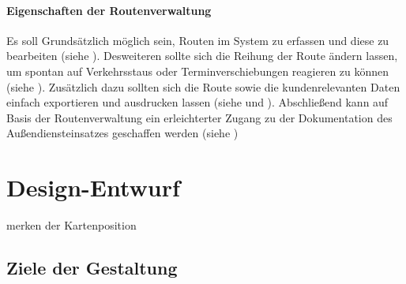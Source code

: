 \documentclass[Bachelorarbeit.tex]{subfiles}
\begin{document}

\paragraph{Eigenschaften der Routenverwaltung}

Es soll Grundsätzlich möglich sein, Routen im System zu erfassen und diese zu bearbeiten (siehe ).
Desweiteren sollte sich die Reihung der Route ändern lassen, um spontan auf Verkehrsstaus oder Terminverschiebungen reagieren zu können (siehe ).
Zusätzlich dazu sollten sich die Route sowie die kundenrelevanten Daten einfach exportieren und ausdrucken lassen (siehe  und ). 
Abschließend kann auf Basis der Routenverwaltung ein erleichterter Zugang zu der Dokumentation des Außendiensteinsatzes geschaffen werden (siehe )

\section{Design-Entwurf}
\label{chap:entwicklung:sec:design_entwurf}

merken der Kartenposition


\subsection{Ziele der Gestaltung}
\label{chap:entwicklung:sec:design_entwurf:subs:ziele_der_gestaltung}
\end{document}
